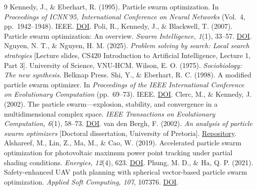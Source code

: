 \documentclass[11pt,a4paper]{article}
\begin{document}
\begin{thebibliography}{9}\small
\setlength{\itemsep}{4pt}
 Kennedy, J., \& Eberhart, R. (1995). Particle swarm optimization. In \textit{Proceedings of ICNN'95, International Conference on Neural Networks} (Vol.~4, pp.~1942--1948). IEEE. \href{https://doi.org/10.1109/ICNN.1995.488968}{DOI}.
 Poli, R., Kennedy, J., \& Blackwell, T. (2007). Particle swarm optimization: An overview. \textit{Swarm Intelligence, 1}(1), 33--57. \href{https://doi.org/10.1007/s11721-007-0002-0}{DOI}.
 Nguyen, N. T., \& Nguyen, H. M. (2025). \textit{Problem solving by search: Local search strategies} [Lecture slides, CS420 Introduction to Artificial Intelligence, Lecture 1, Part 3]. University of Science, VNU-HCM.
 Wilson, E. O. (1975). \textit{Sociobiology: The new synthesis}. Belknap Press.
 Shi, Y., \& Eberhart, R. C. (1998). A modified particle swarm optimizer. In \textit{Proceedings of the IEEE International Conference on Evolutionary Computation} (pp.~69--73). IEEE. \href{https://doi.org/10.1109/ICEC.1998.699146}{DOI}.
 Clerc, M., \& Kennedy, J. (2002). The particle swarm---explosion, stability, and convergence in a multidimensional complex space. \textit{IEEE Transactions on Evolutionary Computation, 6}(1), 58--73. \href{https://doi.org/10.1109/4235.985692}{DOI}.
 van den Bergh, F. (2002). \textit{An analysis of particle swarm optimizers} [Doctoral dissertation, University of Pretoria]. \href{http://hdl.handle.net/2263/24297}{Repository}.
 Alshareef, M., Lin, Z., Ma, M., \& Cao, W. (2019). Accelerated particle swarm optimization for photovoltaic maximum power point tracking under partial shading conditions. \textit{Energies, 12}(4), 623. \href{https://doi.org/10.3390/en12040623}{DOI}.
 Phung, M. D., \& Ha, Q. P. (2021). Safety-enhanced UAV path planning with spherical vector-based particle swarm optimization. \textit{Applied Soft Computing, 107}, 107376. \href{https://doi.org/10.1016/j.asoc.2021.107376}{DOI}.
\end{thebibliography}
\end{document}
